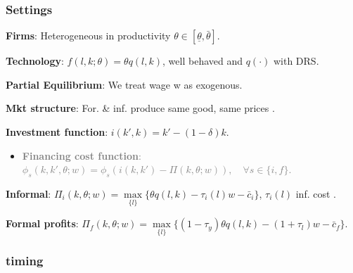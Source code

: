 \documentclass[aspectratio=169]{beamer}
\begin{document}
\begin{frame}[noframenumbering]
\frametitle{Settings}\label{settings}


\textbf{Firms}: Heterogeneous in productivity $\theta \in [\underline{\theta}, \bar{\theta}]$. 

\vspace{4mm}

\textbf{Technology}: $f(l,k; \theta) = \theta q(l,k)$, well behaved and $q(\cdot)$ with DRS. 

\vspace{4mm}

\textbf{Partial Equilibrium}: We treat wage w as exogenous.

\vspace{4mm}

\textbf{Mkt structure}: For. \& inf. produce same good, same prices \textcolor{lightgray}{\citep{imbert2023rural}}.


\vspace{4mm}
    
\textbf{Investment function}: $i(k',k) = k' - (1 - \delta) k$.

\begin{itemize}
    \item \textcolor{gray}{\textbf{Financing cost function}: $\phi_s(k,k',\theta;w) = \phi_s(i(k, k') - \Pi(k,\theta;w)), \quad \forall s \in \{i,f\}$.}
\end{itemize}

\vspace{4mm}


\textbf{Informal}: $\Pi_i(k,\theta;w) = \max \limits_{\{l\}} \{ \theta q(l,k) - \tau_i(l) w - \bar{c}_i \}$, $\tau_i(l)$ inf. cost \textcolor{lightgray}{\citep{ulyssea2018firms}}.

\vspace{4mm}

\textbf{Formal profits}: $\Pi_f(k,\theta;w) = \max \limits_{\{l\}} \{ (1 - \tau_y) \theta q(l,k) - (1 + \tau_l) w - \bar{c}_f \}$. \hyperlink{model}{}

\end{frame}


\begin{frame}[noframenumbering]
\frametitle{timing}

\begin{figure}[h!] 
    \begin{center}
        
    \end{center}
\end{figure}

\hyperlink{model}{}

\end{frame}
\end{document}
